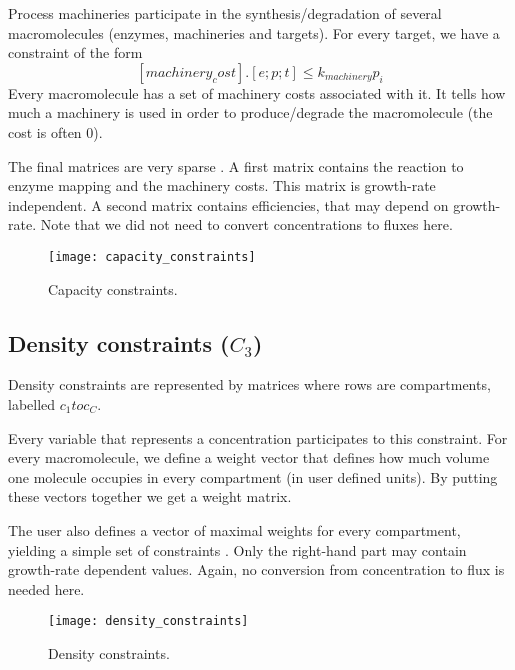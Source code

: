 Process machineries participate in the synthesis/degradation of several
macromolecules (enzymes, machineries and targets).
For every target, we have a constraint of the form
\[
   [machinery_cost].[e; p; t] \leq k_{machinery} p_i
\]
Every macromolecule has a set of machinery costs associated with it.
It tells how much a machinery is used in order to produce/degrade the
macromolecule (the cost is often 0).

The final matrices are very sparse .
A first matrix contains the reaction to enzyme mapping and the machinery
costs. This matrix is growth-rate independent.
A second matrix contains efficiencies, that may depend on growth-rate.
Note that we did not need to convert concentrations to fluxes here.

\begin{figure}
  \centering
  \texttt{[image: capacity\_constraints]}
  \caption{Capacity constraints.}
  \label{fig:capacity_constraints}
\end{figure}

\subsection{Density constraints ($C_3$)}

Density constraints are represented by matrices where rows are compartments,
labelled $c_1 to c_C$.

Every variable that represents a concentration participates to this constraint.
For every macromolecule, we define a weight vector that defines how much
volume one molecule occupies in every compartment (in user defined units).
By putting these vectors together we get a weight matrix.

The user also defines a vector of maximal weights for every compartment,
yielding a simple set of constraints .
Only the right-hand part may contain growth-rate dependent values.
Again, no conversion from concentration to flux is needed here.

\begin{figure}
  \centering
  \texttt{[image: density\_constraints]}
  \caption{Density constraints.}
  \label{fig:density_constraints}
\end{figure}
